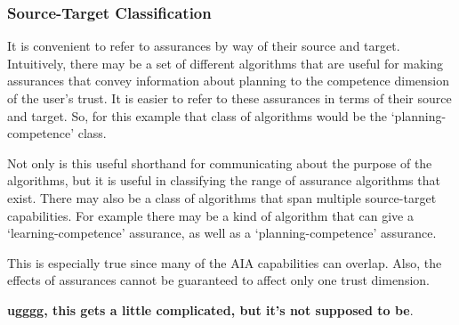 \subsubsection{Source-Target Classification}
    It is convenient to refer to assurances by way of their source and target. Intuitively, there may be a set of different algorithms that are useful for making assurances that convey information about planning to the competence dimension of the user's trust. It is easier to refer to these assurances in terms of their source and target. So, for this example that class of algorithms would be the `planning-competence' class.
    
    Not only is this useful shorthand for communicating about the purpose of the algorithms, but it is useful in classifying the range of assurance algorithms that exist. There may also be a class of algorithms that span multiple source-target capabilities. For example there may be a kind of algorithm that can give a `learning-competence' assurance, as well as a `planning-competence' assurance.

    This is especially true since many of the AIA capabilities can overlap. Also, the effects of assurances cannot be guaranteed to affect only one trust dimension.

    \textbf{ugggg, this gets a little complicated, but it's not supposed to be}.
